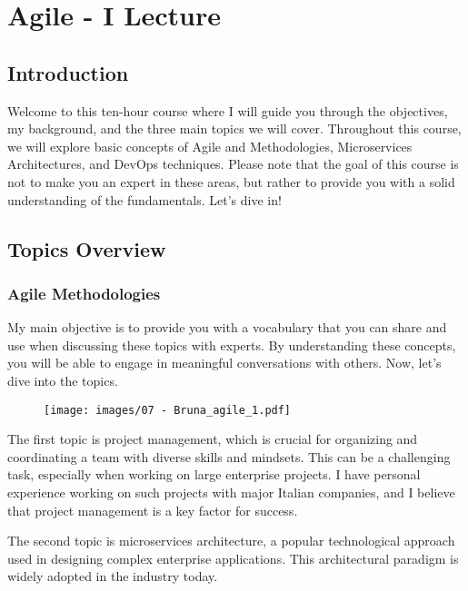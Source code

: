 \section{Agile - I Lecture}

\subsection{Introduction}

Welcome to this ten-hour course where I will guide you through the
objectives, my background, and the three main topics we will cover.
Throughout this course, we will explore basic concepts of Agile and
Methodologies, Microservices Architectures, and DevOps techniques.
Please note that the goal of this course is not to make you an expert in
these areas, but rather to provide you with a solid understanding of the
fundamentals. Let's dive in!

\subsection{Topics Overview}

\subsubsection{Agile Methodologies}

My main objective is to provide you with a vocabulary that you can share
and use when discussing these topics with experts. By understanding
these concepts, you will be able to engage in meaningful conversations
with others. Now, let's dive into the topics.

\begin{figure}[!h]
    \centering
    \texttt{[image: images/07 - Bruna\_agile\_1.pdf]}
\end{figure}

The first topic is project management, which is crucial for organizing
and coordinating a team with diverse skills and mindsets. This can be a
challenging task, especially when working on large enterprise projects.
I have personal experience working on such projects with major Italian
companies, and I believe that project management is a key factor for
success.

The second topic is microservices architecture, a popular technological
approach used in designing complex enterprise applications. This
architectural paradigm is widely adopted in the industry today.

